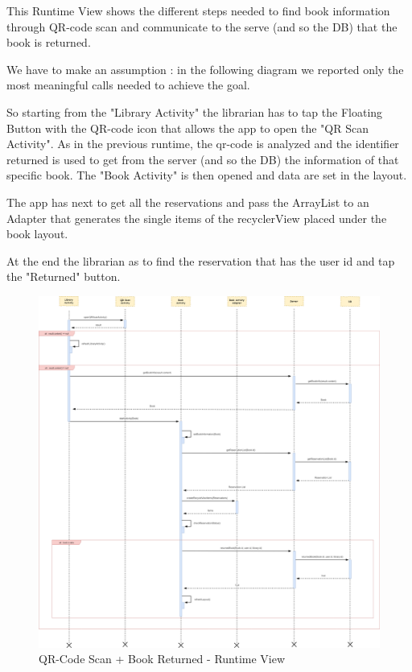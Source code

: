 \newpage
\vspace*{0cm}
\vspace*{0.5cm}

This Runtime View shows the different steps needed to find book information through QR-code scan and communicate to the serve (and so the DB) that the book is returned.\par
We have to make an assumption : in the following diagram we reported only the most meaningful calls needed to achieve the goal.\par
So starting from the "Library Activity" the librarian has to tap the Floating Button with the QR-code icon that allows the app to open the "QR Scan Activity". As in the previous runtime, the qr-code is analyzed and the identifier returned is used to get from the server (and so the DB) the information of that specific book. The "Book Activity" is then opened and data are set in the layout.\par
The app has next to get all the reservations and pass the ArrayList to an Adapter that generates the single items of the recyclerView placed under the book layout.\par
At the end the librarian as to find the reservation that has the user id and tap the "Returned" button.
\newpage
\vspace*{0cm}
\begin{figure}[H]
	\centering
	\includegraphics[scale=0.21]{Images/Runtime/librarian_qrcode_returned}
	\caption{QR-Code Scan + Book Returned - Runtime View}
\end{figure}